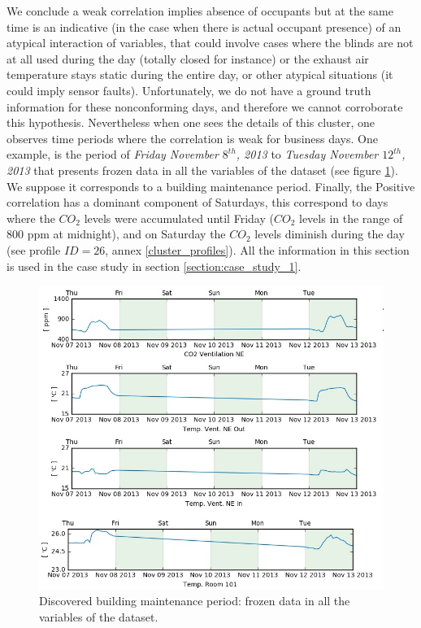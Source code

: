 We conclude a weak correlation implies absence of occupants but at the same time is an indicative (in the case when there is actual occupant presence) of an atypical interaction of variables, that could involve cases where the blinds are not at all used during the day (totally closed for instance) or the exhaust air temperature stays static during the entire day, or other atypical situations (it could imply sensor faults). Unfortunately, we do not have a ground truth information for these nonconforming days, and therefore we cannot corroborate this hypothesis. Nevertheless when one sees the details of this cluster, one observes time periods where the correlation is weak for business days. One example, is the period of \textit{Friday November $8^{th}$, 2013} to \textit{Tuesday November $12^{th}$, 2013} that presents frozen data in all the variables of the dataset (see figure \ref{fig:maintenance}). We suppose it corresponds to a building maintenance period. Finally, the Positive correlation has a dominant component of Saturdays, this correspond to days where the $CO_2$ levels were accumulated until Friday ($CO_2$ levels in the range of 800 ppm at midnight), and on Saturday the $CO_2$ levels diminish during the day (see profile $ID=26$, annex \ref{cluster_profiles}). All the information in this section is used in the case study in section \ref{section:case_study_1}. 

\begin{figure}[h!]
  \vspace{0.5em} %
  \includegraphics[scale=0.65]{Figures/maintenance_period.jpg}
  \caption{Discovered building maintenance period: frozen data in all the variables of the dataset.}
  \label{fig:maintenance}
\end{figure}



